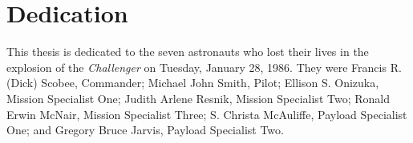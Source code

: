 \chapter*{Dedication}

This thesis is dedicated to the seven astronauts who lost
their lives in the explosion of the {\em Challenger} on
Tuesday, January 28, 1986.  They were
Francis R. (Dick) Scobee, Commander;  Michael John
Smith, Pilot; Ellison S. Onizuka, Mission Specialist One; 
Judith Arlene Resnik, Mission Specialist Two; 
Ronald Erwin McNair, Mission Specialist Three; S. Christa
McAuliffe, Payload Specialist One; and Gregory Bruce Jarvis, Payload 
Specialist Two.
